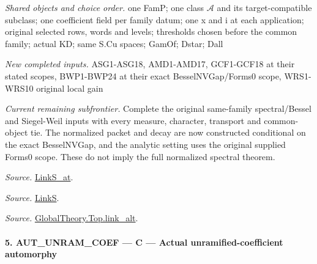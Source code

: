 \emph{Shared objects and choice order.} one FamP; one class $\mathcal A$ and its target-compatible subclass; one coefficient field per family datum; one x and i at each application; original selected rows, words and levels; thresholds chosen before the common family; actual KD; same S.Cu spaces; GamOf; Dstar; Dall

\emph{New completed inputs.} ASG1-ASG18, AMD1-AMD17, GCF1-GCF18 at their stated scopes, BWP1-BWP24 at their exact BesselNVGap/Forms0 scope, WRS1-WRS10 original local gain

\emph{Current remaining subfrontier.} Complete the original same-family spectral/Bessel and Siegel-Weil inputs with every measure, character, transport and common-object tie. The normalized packet and decay are now constructed conditional on the exact BesselNVGap, and the analytic setting uses the original supplied Forms0 scope. These do not imply the full normalized spectral theorem.

\emph{Source.} \href{https://github.com/CocoSgt/riemann-hypothesis-lean/blob/7cbf7a0c32fca1badf05931879a37c3f8a2b03b4/src/Formalism/SharpRestriction/GlobalTheoremInputs.lean#L145-L149}{LinkS\_\allowbreak at}.

\emph{Source.} \href{https://github.com/CocoSgt/riemann-hypothesis-lean/blob/7cbf7a0c32fca1badf05931879a37c3f8a2b03b4/src/Formalism/SharpRestriction/GlobalTheoremInputs.lean#L152-L157}{LinkS}.

\emph{Source.} \href{https://github.com/CocoSgt/riemann-hypothesis-lean/blob/7cbf7a0c32fca1badf05931879a37c3f8a2b03b4/src/Development/AbelianVarietyTheory/Proofs/GlobalInterpolation/LinkAlt.lean#L16-L50}{GlobalTheory.Top.link\_\allowbreak alt}.



\paragraph{5. AUT\_\allowbreak UNRAM\_\allowbreak COEF — C — Actual unramified-coefficient automorphy}

